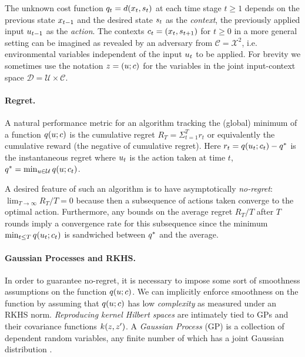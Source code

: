 The unknown cost function $q_{t} = d(x_{t},s_{t})$ at each time stage $t \geq 1$ depends on the previous state $x_{t-1}$ and the desired state $s_{t}$ as the \emph{context}, the previously applied input $u_{t-1}$ as the \emph{action}. The contexts $c_t = (x_{t}, s_{t+1})$ for $t \geq 0$ in a more general setting can be imagined as revealed by an adversary from  $\mathcal{C} = \mathcal{X}^{2}$, i.e. environmental variables independent of the input $u_t$ to be applied. For brevity we sometimes use the notation $z = (u;c)$ for the variables in the joint input-context space $\mathcal{D} = \mathcal{U} \times \mathcal{C}$.

\paragraph*{Regret.} A natural performance metric for an algorithm tracking the (global) minimum of a function $q(u;c)$ is the cumulative regret $R_{T} = \Sigma_{t = 1}^{T}r_{t} $ or equivalently the cumulative reward (the negative of cumulative regret). Here $r_{t} = q(u_{t};c_{t}) - q^{*}$ is the instantaneous regret where $u_t$ is the action taken at time $t$, $q^{*} = \min_{u \in \mathcal{U}}q(u;c_t)$.

A desired feature of such an algorithm is to have asymptotically \emph{no-regret}: $\lim_{T \to \infty}R_{T}/T = 0$ because then a subsequence of actions taken converge to the optimal action. Furthermore, any bounds on the average regret $R_{T}/T$ after $T$ rounds imply a convergence rate for this subsequence since the minimum $\min_{t \leq T}q(u_t;c_t)$ is sandwiched between $q^{*}$ and the average. 

\paragraph*{Gaussian Processes and RKHS.} In order to guarantee no-regret, it is necessary to impose some sort of smoothness assumptions on the function $q(u;c)$. We can implicitly enforce smoothness on the function by assuming that $q(u;c)$ has low \emph{complexity} as measured under an RKHS norm. \emph{Reproducing kernel Hilbert spaces} \cite{Wahba90} are intimately tied to GPs and their covariance functions $k(z,z')$. A \textit{Gaussian Process} (GP) is a collection of dependent random variables, any finite number of which has a joint Gaussian distribution \cite{Rasmussen06}. 

